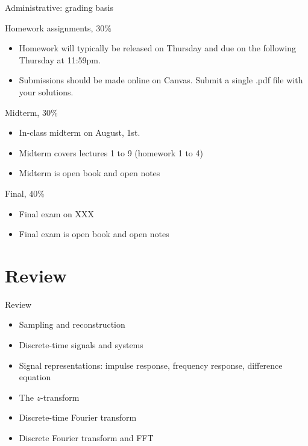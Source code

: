 \documentclass{beamer}
\begin{document}
%
\begin{frame}{Administrative: grading basis}

\begin{block}{Homework assignments, $30\%$}
\begin{itemize} 
\item Homework will typically be released on Thursday and due on the following Thursday at 11:59pm.
\item Submissions should be made online on Canvas. Submit a single .pdf file with your solutions. 
\end{itemize}
\end{block}

\begin{block}{Midterm, $30\%$}
\begin{itemize} 
\item In-class midterm on August, 1st. 
\item Midterm covers lectures 1 to 9 (homework 1 to 4)
\item Midterm is open book and open notes
\end{itemize}
\end{block}

\begin{block}{Final, $40\%$}
\begin{itemize} 
\item Final exam on XXX
\item Final exam is open book and open notes
\end{itemize}
\end{block}

\end{frame}

\section{Review}

\begin{frame}{Review}

\begin{itemize}
\item Sampling and reconstruction
\item Discrete-time signals and systems
\item Signal representations: impulse response, frequency response, difference equation
\item The $z$-transform
\item Discrete-time Fourier transform
\item Discrete Fourier transform and FFT
\end{itemize}

\end{frame}
\end{document}

